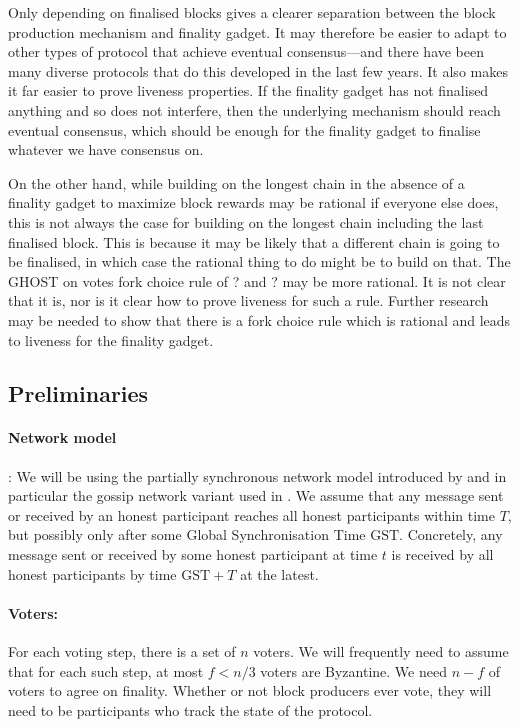 \documentclass{article}
\def\GST{\mathrm{GST}}
\begin{document}
{Only depending on finalised blocks gives a clearer separation between the block production mechanism and finality gadget. It may therefore be easier to adapt to other types of protocol that achieve eventual consensus—and there have been many diverse protocols that do this developed in the last few years.
It also makes it far easier to prove liveness properties.
If the finality gadget has not finalised anything and so does not interfere, then the underlying mechanism should reach eventual consensus, which should be enough for the finality gadget to finalise whatever we have consensus on.

On the other hand, while building on the longest chain in the absence of a finality gadget to maximize block rewards may be rational if everyone else does, this is not always the case for building on the longest chain including the last finalised block.
This is because it may be likely that a different chain is going to be finalised, in which case the rational thing to do might be to build on that. The GHOST on votes fork choice rule of ? and ? may be more rational.
It is not clear that it is, nor is it clear how to prove liveness for such a rule. Further research may be needed to show that there is a fork choice rule which is rational and leads to liveness for the finality gadget. 



}
\subsection{Preliminaries} \label{sec:prelims}

\paragraph{Network model}: We will be using the partially synchronous network model introduced by \cite{DLS} and in particular the gossip network variant used in \cite{Tendermint}.
We assume that any message sent or received by an honest participant reaches all honest participants within time $T$, but possibly only after some Global Synchronisation Time $\GST$.
Concretely, any message sent or received by some honest participant at time $t$ is received by all honest participants by time $\GST+T$ at the latest.


\paragraph{Voters:} 
For each voting step, there is a set of $n$ voters.
We will frequently need to assume that for each such step, at most  $f < n/3$ voters are Byzantine.
We need $n-f$ of voters to agree on finality. Whether or not block producers ever vote, they will need to be participants who track the state of the protocol.
\end{document}
